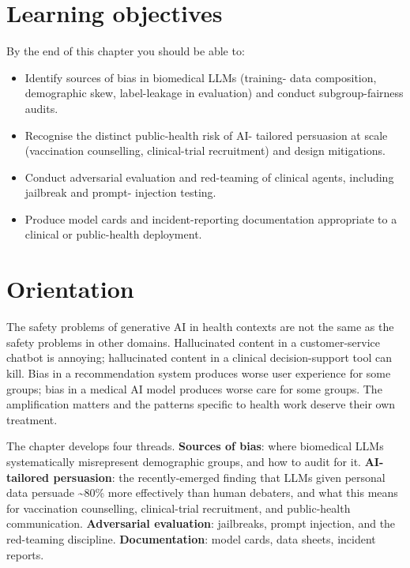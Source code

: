 \documentclass[
  letterpaper,
  11pt]{scrbook}
\providecommand{\tightlist}{%
  \setlength{\itemsep}{0pt}\setlength{\parskip}{0pt}}
\begin{document}
\section{Learning objectives}\label{learning-objectives-10}

By the end of this chapter you should be able to:

\begin{itemize}
\tightlist
\item
  Identify sources of bias in biomedical LLMs (training- data
  composition, demographic skew, label-leakage in evaluation) and
  conduct subgroup-fairness audits.
\item
  Recognise the distinct public-health risk of AI- tailored persuasion
  at scale (vaccination counselling, clinical-trial recruitment) and
  design mitigations.
\item
  Conduct adversarial evaluation and red-teaming of clinical agents,
  including jailbreak and prompt- injection testing.
\item
  Produce model cards and incident-reporting documentation appropriate
  to a clinical or public-health deployment.
\end{itemize}

\section{Orientation}\label{orientation-10}

The safety problems of generative AI in health contexts are not the same
as the safety problems in other domains. Hallucinated content in a
customer-service chatbot is annoying; hallucinated content in a clinical
decision-support tool can kill. Bias in a recommendation system produces
worse user experience for some groups; bias in a medical AI model
produces worse care for some groups. The amplification matters and the
patterns specific to health work deserve their own treatment.

The chapter develops four threads. \textbf{Sources of bias}: where
biomedical LLMs systematically misrepresent demographic groups, and how
to audit for it. \textbf{AI-tailored persuasion}: the recently-emerged
finding that LLMs given personal data persuade \textasciitilde80\% more
effectively than human debaters, and what this means for vaccination
counselling, clinical-trial recruitment, and public-health
communication. \textbf{Adversarial evaluation}: jailbreaks, prompt
injection, and the red-teaming discipline. \textbf{Documentation}: model
cards, data sheets, incident reports.
\end{document}
